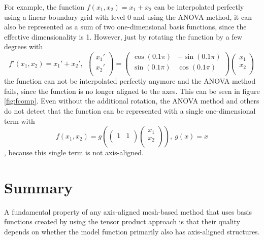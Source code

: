\documentclass[
  a4paper,  %
  twoside,  %
  bibliography=totoc,
  headsepline,
  cleardoublepage=empty,
  parskip=half,
  draft=false
]{scrbook}
\begin{document}
For example, the function $f(x_1,x_2)=x_1 + x_2$ can be interpolated perfectly using a linear boundary grid with level 0 and using the ANOVA method, it can also be represented as a sum of two one-dimensional basis functions, since the effective dimensionality is 1.
However, just by rotating the function by a few degrees with
\begin{equation}
f'(x_1,x_2)=x_1' + x_2', ~~ \begin{pmatrix}
    x_1' \\ x_2'
    \\
  \end{pmatrix} = \begin{pmatrix}
    \cos(0.1 \pi) & -\sin(0.1 \pi)\\
    \sin(0.1 \pi) & \cos(0.1 \pi)
    \\
  \end{pmatrix}\begin{pmatrix}
    x_1 \\ x_2
    \\
  \end{pmatrix}
\end{equation}
the function can not be interpolated perfectly anymore and the ANOVA method fails, since the function is no longer aligned to the axes.
This can be seen in figure \ref{fig:fcomp}.
Even without the additional rotation, the ANOVA method and others do not detect that the function can be represented with a single one-dimensional term with
\begin{equation}
f(x_1,x_2)=g(\begin{pmatrix}
    1 & 1
    \\
  \end{pmatrix} \begin{pmatrix}
    x_1 \\ x_2
    \\
  \end{pmatrix}), ~ g(x)=x
\end{equation}
, because this single term is not axis-aligned.

\section{Summary}

A fundamental property of any axis-aligned mesh-based method that uses basis functions created by using the tensor product approach is that their quality depends on whether the model function primarily also has axis-aligned structures.
\end{document}
